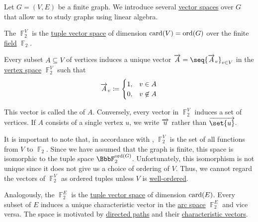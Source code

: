 \begin{definition}\label{def:graph_spaces}
  Let \( G = (V, E) \) be a finite graph. We introduce several \hyperref[def:vector_space]{vector spaces} over \( G \) that allow us to study graphs using linear algebra.

  \begin{thmenum}
     The  \( \BbbF_2^V \) is the \hyperref[def:left_module_of_tuples]{tuple vector space} of dimension \( \operatorname{card}(V) = \operatorname{ord}(G) \) over the finite \hyperref[def:field]{field} \hyperref[thm:f2_is_boolean_algebra]{\( \BbbF_2 \)}.

    Every subset \( A \subseteq V \) of vertices induces a unique vector \( \vect{A} = \seq{ \vect{A}_v }_{v \in V} \) in the \hyperref[def:graph_spaces/vertex]{vertex space} \( \BbbF_2^V \) such that
    \begin{equation*}
      \overrightarrow{A}_v \coloneqq \begin{cases}
        1, &v \in A \\
        0, &v \not\in A
      \end{cases}
    \end{equation*}

    This vector is called the  of \( A \). Conversely, every vector in \( \BbbF_2^V \) induces a set of vertices. If \( A \) consists of a single vertex \( u \), we write \( \overrightarrow{u} \) rather than \( \vect{\set{u}} \).

    It is important to note that, in accordance with , \( \BbbF_2^V \) is the set of all functions from \( V \) to \( \BbbF_2 \). Since we have assumed that the graph is finite, this space is isomorphic to the tuple space \( \BbbF_2^{\ord(G)} \). Unfortunately, this isomorphism is not unique since it does not give us a choice of ordering of \( V \). Thus, we cannot regard the vectors of \( \BbbF_2^V \) as ordered tuples unless \( V \) is \hyperref[def:well_ordered_set]{well-ordered}.

     Analogously, the  \( \BbbF_2^E \) is the \hyperref[def:left_module_of_tuples]{tuple vector space} of dimension \( \operatorname{card}(E) \). Every subset of \( E \) induces a unique characteristic vector in the \hyperref[def:graph_spaces/arc]{arc space} \( \BbbF_2^E \) and vice versa. The space is motivated by \hyperref[def:graph_directed_path]{directed paths} and their \hyperref[def:graph_directed_path/characteristic_vector]{characteristic vectors}.


\end{thmenum}
\end{definition}
